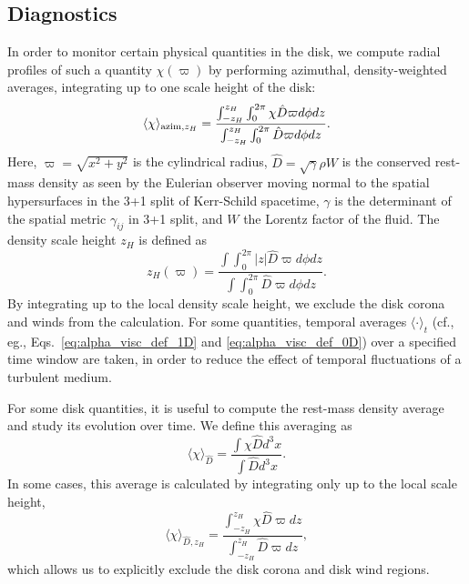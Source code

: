\subsection{Diagnostics}\label{subsec:diagnostics}

In order to monitor certain physical quantities in the disk, we compute radial profiles of such a quantity $\chi(\varpi)$ by performing azimuthal, density-weighted averages, integrating up to one scale height of the disk:
\begin{equation}\label{eq:radial_av}
    \langle \chi \rangle_{{\rm azim}, z_H} = \frac{\int^{z_H}_{-z_H} \int_0^{2\pi} \chi \hat D \varpi d\phi dz}{\int^{z_H}_{-z_H} \int_0^{2\pi} \hat D \varpi d\phi dz}.
\end{equation}
Here, $\varpi = \sqrt{x^2 + y^2}$ is the cylindrical radius, $\hat D = \sqrt{\gamma} \rho W$ is the conserved rest-mass density as seen by the Eulerian observer moving normal to the spatial hypersurfaces in the 3+1 split of Kerr-Schild spacetime, $\gamma$ is the determinant of the spatial metric $\gamma_{ij}$ in 3+1 split, and $W$ the Lorentz factor of the fluid. The density scale height $z_H$ is defined as
\begin{equation}
    z_H (\varpi) = \frac{\int \int_0^{2\pi} |z| \hat D \varpi d\phi dz}{\int \int_0^{2\pi}\hat D \varpi d\phi dz}.
\end{equation}
By integrating up to the local density scale height, we exclude the disk corona and winds from the calculation. For some quantities, temporal averages $\langle\cdot\rangle_t$ (cf., eg., Eqs.~\eqref{eq:alpha_visc_def_1D} and \eqref{eq:alpha_visc_def_0D}) over a specified time window are taken, in order to reduce the effect of temporal fluctuations of a turbulent medium.

For some disk quantities, it is useful to compute the rest-mass density average and study its evolution over time. We define this averaging as
\begin{equation}\label{eq:rest_mass_dens}
 \langle \chi \rangle_{\hat D} = \frac{\int \chi \hat D d^3x}{\int \hat D d^3x}.
\end{equation}
In some cases, this average is calculated by integrating only up to the local scale height,
\begin{equation}\label{eq:rest_mass_dens_scaleht}
    \langle \chi \rangle_{\hat D, z_H} = \frac{\int^{z_H}_{-z_H} \chi \hat D \varpi dz}{\int^{z_H}_{-z_H} \hat D \varpi dz},
\end{equation}
which allows us to explicitly exclude the disk corona and disk wind regions.


